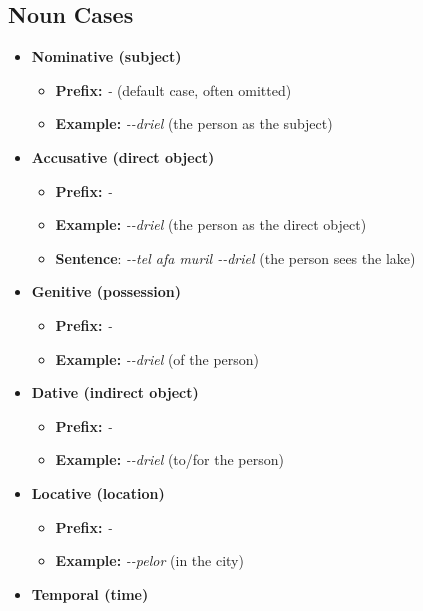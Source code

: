 \documentclass[letterpaper,twocolumn,openany,nodeprecatedcode,hidelinks]{dndbook}
\begin{document}
{\subsection*{Noun Cases}
\begin{itemize}
    \item \textbf{Nominative (subject)}
    \begin{itemize}
        \item \textbf{Prefix:} \textit{\CAnom-} (default case, often omitted)
        \item \textbf{Example:} \textit{\CAnom-\CLan-driel} (the person as the subject)
    \end{itemize}
    \item \textbf{Accusative (direct object)}
    \begin{itemize}
        \item \textbf{Prefix:} \textit{\CAacc-}
        \item \textbf{Example:} \textit{\CAacc-\CLan-driel} (the person as the direct object)
        \item \textbf{Sentence}: \textit{\CAacc-\CLin-tel afa muril \CAnom-\CLan-driel} (the person sees the lake)
    \end{itemize}
    \item \textbf{Genitive (possession)}
    \begin{itemize}
        \item \textbf{Prefix:} \textit{\CAgen-}
        \item \textbf{Example:} \textit{\CAgen-\CLan-driel} (of the person)
    \end{itemize}
    \item \textbf{Dative (indirect object)}
    \begin{itemize}
        \item \textbf{Prefix:} \textit{\CAdat-}
        \item \textbf{Example:} \textit{\CAdat-\CLan-driel} (to/for the person)
    \end{itemize}
    \item \textbf{Locative (location)}
    \begin{itemize}
        \item \textbf{Prefix:} \textit{\CAloc-}
        \item \textbf{Example:} \textit{\CAloc-\CLin-pelor} (in the city)
    \end{itemize}
        \item \textbf{Temporal (time)}
    \begin{itemize}

\end{itemize}
\end{itemize}}
\end{document}
